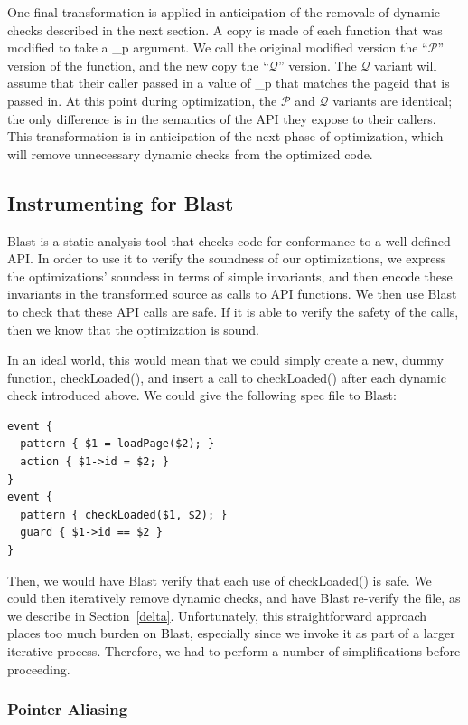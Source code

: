 \documentclass[10pt,letterpaper,twocolumn,english]{article}
\newcommand{\checkpage}{checkLoaded()\xspace}
\newcommand{\PP}{\_p\xspace}
\newcommand{\fP}{{$\mathcal P$}\xspace}
\newcommand{\fQ}{{$\mathcal Q$}\xspace}
\begin{document}
One final transformation is applied in anticipation of the removale of
dynamic checks described in the next section.  A copy is made of each
function that was modified to take a \PP argument.  We call the
original modified version the ``\fP'' version of the function, and the
new copy the ``\fQ'' version.  The \fQ variant will assume that their caller
passed in a value of \PP that matches the pageid that is passed in.
At this point during optimization, the \fP and \fQ variants are
identical; the only difference is in the semantics of the API they
expose to their callers.  This transformation is in anticipation of
the next phase of optimization, which will remove unnecessary dynamic
checks from the optimized code.

\subsection{Instrumenting for Blast}
\label{instrumenting}
Blast is a static analysis tool that checks code for conformance to a
well defined API.  In order to use it to verify the soundness of our
optimizations, we express the optimizations' soundess in terms of
simple invariants, and then encode these invariants in the transformed
source as calls to API functions.  We then use Blast to check that
these API calls are safe.  If it is able to verify the safety of the
calls, then we know that the optimization is sound.  

In an ideal world, this would mean that we could simply create a new,
dummy function, \checkpage, and insert a call to \checkpage
after each dynamic check introduced above.  We could give the
following spec file to Blast:

\begin{verbatim}
event { 
  pattern { $1 = loadPage($2); }
  action { $1->id = $2; }
}
event { 
  pattern { checkLoaded($1, $2); }  
  guard { $1->id == $2 }
}
\end{verbatim}

Then, we would have Blast verify that each use of \checkpage is safe.
We could then iteratively remove dynamic checks, and have Blast
re-verify the file, as we describe in Section~\ref{delta}.
Unfortunately, this straightforward approach places too much burden on
Blast, especially since we invoke it as part of a larger iterative
process.  Therefore, we had to perform a number of simplifications
before proceeding.

\subsubsection{Pointer Aliasing}
\end{document}
